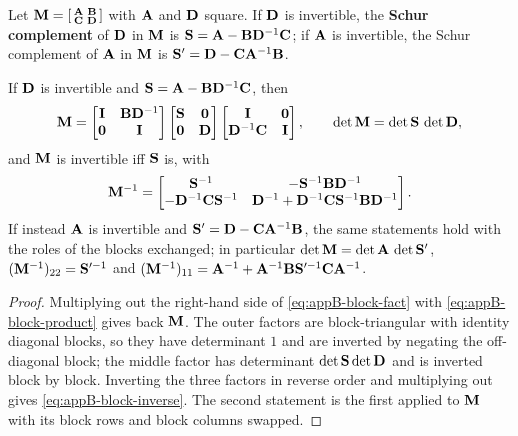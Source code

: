 \begin{definition}
\label{def:appB-schur}
Let $\mathbf{M} = \begin{bsmallmatrix}\mathbf{A} & \mathbf{B}\\ \mathbf{C} & \mathbf{D}\end{bsmallmatrix}$ with $\mathbf{A}$ and $\mathbf{D}$ square. If $\mathbf{D}$ is invertible, the \textbf{Schur complement} of $\mathbf{D}$ in $\mathbf{M}$ is $\mathbf{S} = \mathbf{A} - \mathbf{B}\mathbf{D}^{-1}\mathbf{C}$; if $\mathbf{A}$ is invertible, the Schur complement of $\mathbf{A}$ in $\mathbf{M}$ is $\mathbf{S}' = \mathbf{D} - \mathbf{C}\mathbf{A}^{-1}\mathbf{B}$.
\end{definition}

\begin{theorem}
\label{thm:appB-block}
If $\mathbf{D}$ is invertible and $\mathbf{S} = \mathbf{A} - \mathbf{B}\mathbf{D}^{-1}\mathbf{C}$, then
\begin{equation}
  \mathbf{M} =
  \begin{bmatrix}\mathbf{I} & \mathbf{B}\mathbf{D}^{-1}\\ \mathbf{0} & \mathbf{I}\end{bmatrix}
  \begin{bmatrix}\mathbf{S} & \mathbf{0}\\ \mathbf{0} & \mathbf{D}\end{bmatrix}
  \begin{bmatrix}\mathbf{I} & \mathbf{0}\\ \mathbf{D}^{-1}\mathbf{C} & \mathbf{I}\end{bmatrix},
  \qquad \det\mathbf{M} = \det\mathbf{S}\,\det\mathbf{D},
  \label{eq:appB-block-fact}
\end{equation}
and $\mathbf{M}$ is invertible iff $\mathbf{S}$ is, with
\begin{equation}
  \mathbf{M}^{-1} =
  \begin{bmatrix}\mathbf{S}^{-1} & -\mathbf{S}^{-1}\mathbf{B}\mathbf{D}^{-1}\\
   -\mathbf{D}^{-1}\mathbf{C}\mathbf{S}^{-1} & \mathbf{D}^{-1} + \mathbf{D}^{-1}\mathbf{C}\mathbf{S}^{-1}\mathbf{B}\mathbf{D}^{-1}\end{bmatrix}.
  \label{eq:appB-block-inverse}
\end{equation}
If instead $\mathbf{A}$ is invertible and $\mathbf{S}' = \mathbf{D} - \mathbf{C}\mathbf{A}^{-1}\mathbf{B}$, the same statements hold with the roles of the blocks exchanged; in particular $\det\mathbf{M} = \det\mathbf{A}\,\det\mathbf{S}'$, $(\mathbf{M}^{-1})_{22} = \mathbf{S}'^{-1}$ and $(\mathbf{M}^{-1})_{11} = \mathbf{A}^{-1} + \mathbf{A}^{-1}\mathbf{B}\mathbf{S}'^{-1}\mathbf{C}\mathbf{A}^{-1}$.
\end{theorem}
\begin{proof}
Multiplying out the right-hand side of \cref{eq:appB-block-fact} with \cref{eq:appB-block-product} gives back $\mathbf{M}$. The outer factors are block-triangular with identity diagonal blocks, so they have determinant $1$ and are inverted by negating the off-diagonal block; the middle factor has determinant $\det\mathbf{S}\det\mathbf{D}$ and is inverted block by block. Inverting the three factors in reverse order and multiplying out gives \cref{eq:appB-block-inverse}. The second statement is the first applied to $\mathbf{M}$ with its block rows and block columns swapped. \qedhere
\end{proof}


